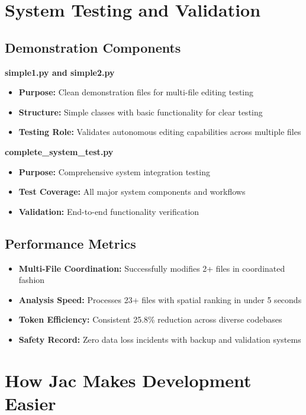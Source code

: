 \documentclass[12pt,a4paper]{article}
\begin{document}
\section{System Testing and Validation}

\subsection{Demonstration Components}

\textbf{simple1.py and simple2.py}
\begin{itemize}
    \item \textbf{Purpose:} Clean demonstration files for multi-file editing testing
    \item \textbf{Structure:} Simple classes with basic functionality for clear testing
    \item \textbf{Testing Role:} Validates autonomous editing capabilities across multiple files
\end{itemize}

\textbf{complete\_system\_test.py}
\begin{itemize}
    \item \textbf{Purpose:} Comprehensive system integration testing
    \item \textbf{Test Coverage:} All major system components and workflows
    \item \textbf{Validation:} End-to-end functionality verification
\end{itemize}

\subsection{Performance Metrics}

\begin{itemize}
    \item \textbf{Multi-File Coordination:} Successfully modifies 2+ files in coordinated fashion
    \item \textbf{Analysis Speed:} Processes 23+ files with spatial ranking in under 5 seconds
    \item \textbf{Token Efficiency:} Consistent 25.8\% reduction across diverse codebases
    \item \textbf{Safety Record:} Zero data loss incidents with backup and validation systems
\end{itemize}

\section{How Jac Makes Development Easier}
\end{document}
